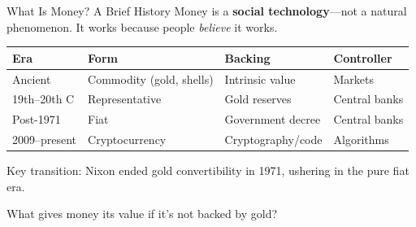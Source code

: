 ﻿\documentclass[aspectratio=169,11pt]{beamer}
\begin{document}
\begin{frame}{What Is Money? A Brief History}
Money is a \textbf{social technology}---not a natural phenomenon. It works because people \emph{believe} it works.

\vspace{0.3em}
\begin{table}[h]
\centering
\footnotesize
\begin{tabular}{@{}llll@{}}
\toprule
\textbf{Era} & \textbf{Form} & \textbf{Backing} & \textbf{Controller} \\
\midrule
Ancient & Commodity (gold, shells) & Intrinsic value & Markets \\
19th--20th C & Representative & Gold reserves & Central banks \\
Post-1971 & Fiat & Government decree & Central banks \\
2009--present & Cryptocurrency & Cryptography/code & Algorithms \\
\bottomrule
\end{tabular}
\end{table}

\vspace{0.3em}
Key transition: Nixon ended gold convertibility in 1971, ushering in the pure fiat era.

\begin{discussionbox}[Discussion]
What gives money its value if it's not backed by gold?
\end{discussionbox}
\end{frame}
\end{document}
